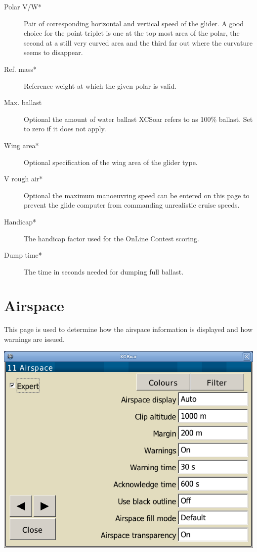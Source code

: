 \begin{description}
\item[Polar V/W*]  Pair of corresponding horizontal and vertical speed of the glider. 
  A good choice for the point triplet is one at the top most area of the polar, the second at a 
  still very curved area and the third far out where the curvature seems to disappear.
\item[Ref. mass*]  Reference weight at which the given polar is valid.
\item[Max. ballast]  Optional the amount of water ballast XCSoar refers to as 100\% ballast.
  Set to zero if it does not apply.
\item[Wing area*]  Optional specification of the wing area of the glider type.
\item[V rough air*] Optional the maximum manoeuvring speed can 
  be entered on this page to prevent the glide computer from commanding 
  unrealistic cruise speeds.
\item[Handicap*]  The handicap factor used for the OnLine Contest scoring.
\item[Dump time*]  The time in seconds needed for dumping full ballast.
\end{description}


\clearpage
\section{Airspace}

This page is used to determine how the airspace information is
displayed and how warnings are issued.

\begin{center}
\includegraphics[angle=0,width=0.8\linewidth,keepaspectratio='true']{figures/config-airspace.png}
\end{center}

